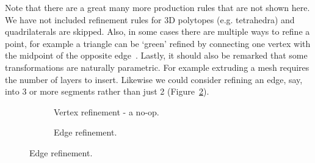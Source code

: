 Note that there are a great many more production rules that are not shown here.
We have not included refinement rules for 3D polytopes (e.g. tetrahedra) and quadrilaterals are skipped.
Also, in some cases there are multiple ways to refine a point, for example a triangle can be `green' refined by connecting one vertex with the midpoint of the opposite edge~\cite{bankRefinementAlgorithmDynamic}.
Lastly, it should also be remarked that some transformations are naturally parametric.
For example extruding a mesh requires the number of layers to insert.
Likewise we could consider refining an edge, say, into 3 or more segments rather than just 2 (Figure~\ref{fig:transform_refinement_edge}).

\begin{figure}
  \centering

  \begin{subfigure}{\textwidth}
    \centering
    \caption{Vertex refinement - a no-op.}
  \end{subfigure}

  \vspace{1em}

  \begin{subfigure}{\textwidth}
    \centering
    \caption{Edge refinement.}
    \label{fig:transform_refinement_edge}
  \end{subfigure}


\end{figure}

